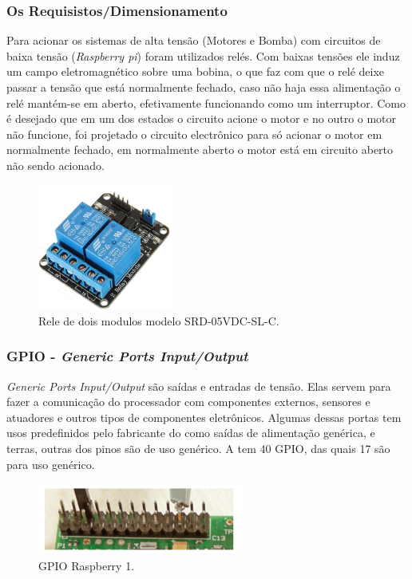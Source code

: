\subsubsection{Os Requisistos/Dimensionamento}
Para acionar os sistemas de alta tensão (Motores e Bomba) com circuitos de baixa tensão (\textit{Raspberry pi}) foram utilizados relés. Com baixas tensões ele induz um campo eletromagnético sobre uma bobina, o que faz com que o relé deixe passar a tensão que está normalmente fechado, caso não haja essa alimentação o relé mantém-se em aberto, efetivamente funcionando como um interruptor.  Como é desejado que em um dos estados o circuito acione o motor e no outro o motor não funcione, foi projetado o circuito electrônico para só acionar o motor em normalmente fechado, em normalmente aberto o motor está em circuito aberto não sendo acionado.
\par
\begin{figure}[h]
  \centering
  \includegraphics[width=0.4\textwidth]{figures/rele.png}
  \caption{Rele de dois modulos modelo SRD-05VDC-SL-C.}
  \label{fig:rele}
\end{figure}
\FloatBarrier
\par

\subsubsection{GPIO - \textit{Generic Ports Input/Output}}
\textit{Generic Ports Input/Output} são saídas e entradas de tensão. Elas servem para fazer a comunicação do processador com componentes externos, sensores e atuadores e outros tipos de componentes eletrônicos. Algumas dessas portas tem usos predefinidos pelo fabricante do \hardware como saídas de alimentação genérica, e terras, outras dos pinos são de uso genérico. A \rasp tem 40 GPIO, das quais  17 são para uso genérico.
\par
\begin{figure}[h]
  \centering
  \includegraphics[width=0.6\textwidth]{figures/gpio.png}
  \caption{GPIO Raspberry 1.}
  \label{fig:gpio}
\end{figure}
\FloatBarrier
\par

